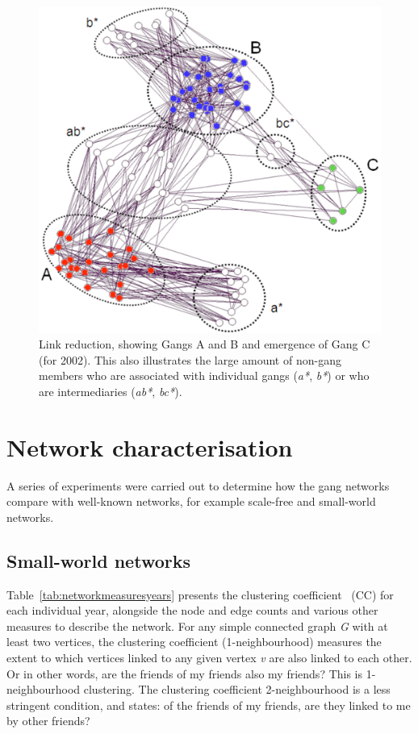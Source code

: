 \documentclass[conference]{IEEEtran}
\theoremstyle{definition}
\begin{document}
\begin{figure}[htb]
\centering
\includegraphics[width=0.8\columnwidth]{images/2002core_labelled}
\caption{Link reduction, showing Gangs A and B and emergence of
  Gang C (for 2002). This also illustrates the large amount of non-gang
  members who are associated with individual gangs (\emph{a*}, \emph{b*}) or who are intermediaries (\emph{ab*}, \emph{bc*}).}
\label{fig:2002core_labelled}
\end{figure}


\section{Network characterisation}\label{sec:networkcharacteristics}
A series of experiments were carried out to determine how the gang
networks compare with well-known networks, for example scale-free and
small-world networks.

\subsection{Small-world networks}\label{sec:smallworld}
Table~\ref{tab:networkmeasuresyears} presents the clustering
coefficient~\cite{WattsStrogatz1998} (CC) for each individual year,
alongside the node and edge counts and various other measures to
describe the network. For any simple connected graph \emph{G} with at
least two vertices, the clustering coefficient (1-neighbourhood)
\cite{WattsStrogatz1998} measures the extent to which vertices linked
to any given vertex \emph{v} are also linked to each other. Or in
other words, are the friends of my friends also my friends? This is
1-neighbourhood clustering. The clustering coefficient 2-neighbourhood
is a less stringent condition, and states: of the friends of my
friends, are they linked to me by other friends?
\end{document}
